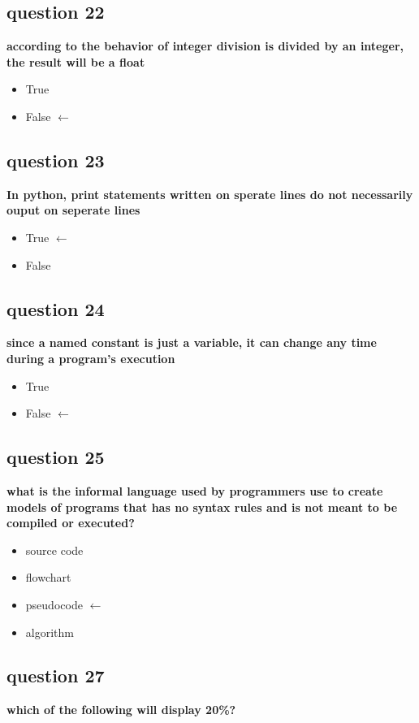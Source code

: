 \documentclass[10pt]{article}
\begin{document}
\subsection*{question 22}
\textbf{according to the behavior of integer division is divided by an integer, the result will be a float}
\begin{itemize}
\item True 
\item False $\leftarrow$
\end{itemize}
\subsection*{question 23}
\textbf{In python, print statements written on sperate lines do not necessarily ouput on seperate lines}
\begin{itemize}
\item True $\leftarrow$
\item False
\end{itemize}
\subsection*{question 24}
\textbf{since a named constant is just a variable, it can change any time during a program's execution}
\begin{itemize}
\item True
\item False $\leftarrow$
\end{itemize}
\subsection*{question 25}
\textbf{what is the informal language used by programmers use to create models of programs that has no syntax rules and is not meant to be compiled or executed?}
\begin{itemize}
\item source code 
\item flowchart
\item pseudocode $\leftarrow$
\item algorithm
\end{itemize}
\subsection*{question 27}
\textbf{which of the following will display 20\%?}
\end{document}

